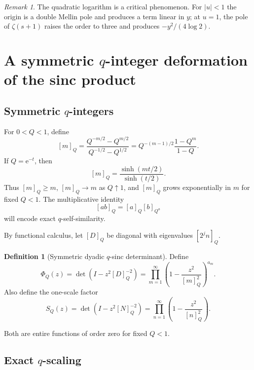 \documentclass[11pt]{article}
\numberwithin{equation}{section}
\theoremstyle{definition}
\newtheorem{definition}[theorem]{Definition}
\theoremstyle{remark}
\newtheorem{remark}[theorem]{Remark}
\newcommand{\e}{\mathrm e}
\begin{document}
\begin{remark}
The quadratic logarithm is a critical phenomenon.  For $|u|<1$ the origin is a double Mellin pole and produces a term linear in $y$; at $u=1$, the pole of $\zeta(s+1)$ raises the order to three and produces $-y^2/(4\log2)$.
\end{remark}

\section{A symmetric $q$-integer deformation of the sinc product}

\subsection{Symmetric $q$-integers}

For $0<Q<1$, define
\begin{equation}\label{p7:eq:q-int}
 [m]_Q=\frac{Q^{-m/2}-Q^{m/2}}{Q^{-1/2}-Q^{1/2}}
 =Q^{-(m-1)/2}\frac{1-Q^m}{1-Q}.
\end{equation}
If $Q=\e^{-t}$, then
\begin{equation}\label{p7:eq:q-int-sinh}
 [m]_Q=\frac{\sinh(mt/2)}{\sinh(t/2)}.
\end{equation}
Thus $[m]_Q\ge m$, $[m]_Q\to m$ as $Q\uparrow1$, and $[m]_Q$ grows exponentially in $m$ for fixed $Q<1$.  The multiplicative identity
\begin{equation}\label{p7:eq:q-int-mult}
 [ab]_Q=[a]_Q[b]_{Q^a}
\end{equation}
will encode exact $q$-self-similarity.

By functional calculus, let $[D]_Q$ be diagonal with eigenvalues $[2^jn]_Q$.

\begin{definition}[Symmetric dyadic $q$-sinc determinant]\label{p7:def:PhiQ}
Define
\begin{equation}\label{p7:eq:PhiQ}
 \boxed{\ \Phi_Q(z)=\det(I-z^2[D]_Q^{-2})
 =\prod_{m=1}^{\infty}
 \left(1-\frac{z^2}{[m]_Q^2}\right)^{a_m}.\ }
\end{equation}
Also define the one-scale factor
\begin{equation}\label{p7:eq:SQ}
 S_Q(z)=\det(I-z^2[N]_Q^{-2})
 =\prod_{n=1}^{\infty}\left(1-\frac{z^2}{[n]_Q^2}\right).
\end{equation}
\end{definition}
Both are entire functions of order zero for fixed $Q<1$.

\subsection{Exact $q$-scaling}
\end{document}
